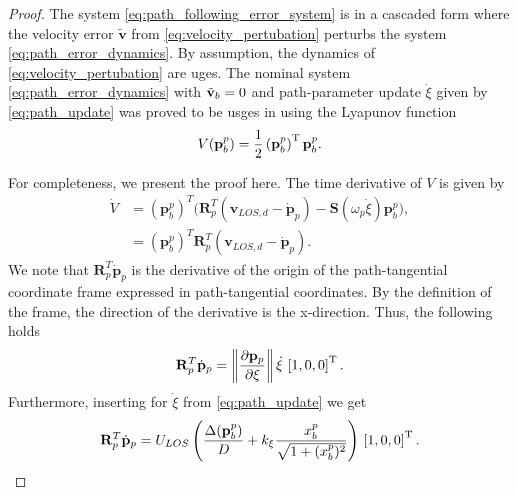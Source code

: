 \begin{proof}
    The system \eqref{eq:path_following_error_system} is in a cascaded form where the velocity error $\tilde{\mathbf{v}}$ from \eqref{eq:velocity_pertubation} perturbs the system \eqref{eq:path_error_dynamics}. By assumption, the dynamics of \eqref{eq:velocity_pertubation} are \gls{uges}. The nominal system \eqref{eq:path_error_dynamics} with $\Tilde{\mathbf{v}}_b = 0$ and path-parameter update $\dot{\xi}$ given by \eqref{eq:path_update} was proved to be \gls{usges} in \cite{matous_singularity-free_2022} using the Lyapunov function
    \begin{equation}
    V(\mathbf{p}_b^p) = \frac{1}{2} \left(\mathbf{p}_b^p\right)^{\rm T}\mathbf{p}_b^p.
    \end{equation}

    For completeness, we present the proof here. The time derivative of $V$ is given by
    \begin{equation}
        \begin{split}
        \dot{V} &= (\mathbf{p}_b^p)^T \bigl(\mathbf{R}_p^T(\mathbf{v}_{LOS,d} -\dot{\mathbf{p}}_p) - \mathbf{S}(\omega_p \dot{\xi})\mathbf{p}_b^p\bigr),\\
        &= (\mathbf{p}_b^p)^T\mathbf{R}_p^T(\mathbf{v}_{LOS,d} -\dot{\mathbf{p}}_p).
        \end{split}
    \end{equation}
    We note that $\mathbf{R}^T_p \dot{\mathbf{p}}_p$ is the derivative of the origin of the path-tangential coordinate frame expressed in path-tangential coordinates. By the definition of the frame, the direction of the derivative is the x-direction. Thus, the following holds
    \begin{equation}
        \mathbf{R}^T_p \dot{\mathbf{p}}_p = \left\| \frac{\partial \mathbf{p}_p}{\partial \xi}\right\| \dot{\xi} \,\left[ 1,0,0 \right]^{\rm T}.
    \end{equation}
    Furthermore, inserting for $\dot{\xi}$ from \eqref{eq:path_update} we get
    \begin{equation}
        \mathbf{R}^T_p \dot{\mathbf{p}}_p = U_{LOS} \left (\frac{\Delta(\mathbf{p}_b^p)}{D} + k_\xi\frac{x_b^p}{\sqrt{1 + (x_b^p)^2}} \right ) \,\left[ 1,0,0 \right]^{\rm T}.
    \end{equation}


\end{proof}

